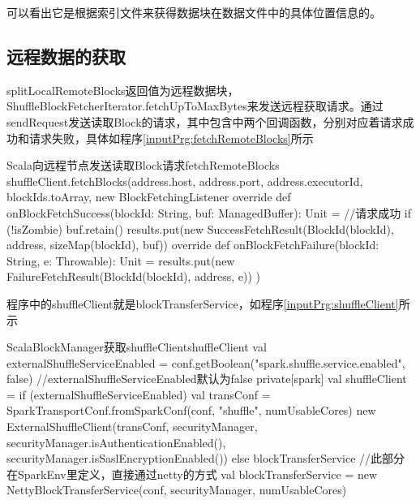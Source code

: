 可以看出它是根据索引文件来获得数据块在数据文件中的具体位置信息的。
\subsection{远程数据的获取}
splitLocalRemoteBlocks返回值为远程数据块，ShuffleBlockFetcherIterator.fetchUpToMaxBytes来发送远程获取请求。通过sendRequest发送读取Block的请求，其中包含中两个回调函数，分别对应着请求成功和请求失败，具体如程序\ref{inputPrg:fetchRemoteBlocks}所示
\begin{codeInput}{Scala}{向远程节点发送读取Block请求}{fetchRemoteBlocks}
shuffleClient.fetchBlocks(address.host, address.port, address.executorId, blockIds.toArray,
new BlockFetchingListener {
  override def onBlockFetchSuccess(blockId: String, buf: ManagedBuffer): Unit = {//请求成功
    if (!isZombie) {
      buf.retain()
      results.put(new SuccessFetchResult(BlockId(blockId), address, sizeMap(blockId), buf))
    }
  }	
  override def onBlockFetchFailure(blockId: String, e: Throwable): Unit = {
    results.put(new FailureFetchResult(BlockId(blockId), address, e))
  }
})
\end{codeInput}

程序中的shuffleClient就是blockTransferService，如程序\ref{inputPrg:shuffleClient}所示
\begin{codeInput}{Scala}{BlockManager获取shuffleClient}{shuffleClient}
val externalShuffleServiceEnabled = conf.getBoolean("spark.shuffle.service.enabled", false)
//externalShuffleServiceEnabled默认为false
private[spark] val shuffleClient = if (externalShuffleServiceEnabled) {
  val transConf = SparkTransportConf.fromSparkConf(conf, "shuffle", numUsableCores)
  new ExternalShuffleClient(transConf, securityManager, securityManager.isAuthenticationEnabled(),
  securityManager.isSaslEncryptionEnabled())
} else {
  blockTransferService
}
//此部分在SparkEnv里定义，直接通过netty的方式
val blockTransferService = new NettyBlockTransferService(conf, securityManager, numUsableCores)
\end{codeInput}
